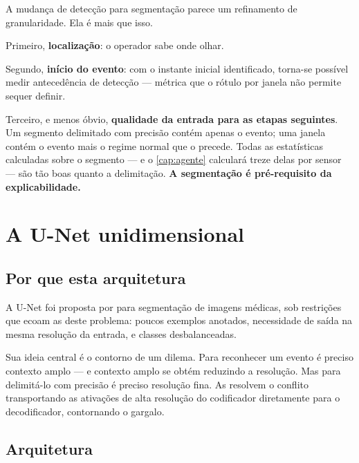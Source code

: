 \begin{destaque}
A mudança de detecção para segmentação parece um refinamento de granularidade. Ela é
mais que isso.

Primeiro, \textbf{localização}: o operador sabe onde olhar.

Segundo, \textbf{início do evento}: com o instante inicial identificado, torna-se
possível medir antecedência de detecção --- métrica que o rótulo por janela não permite
sequer definir.

Terceiro, e menos óbvio, \textbf{qualidade da entrada para as etapas seguintes}. Um
segmento delimitado com precisão contém apenas o evento; uma janela contém o evento mais
o regime normal que o precede. Todas as estat\'isticas calculadas sobre o segmento ---
e o \cref{cap:agente} calculará treze delas por sensor --- são tão boas quanto a
delimitação. \textbf{A segmentação é pré-requisito da explicabilidade.}
\end{destaque}

\section{A U-Net unidimensional}

\subsection{Por que esta arquitetura}

A U-Net foi proposta por \citet{Ronneberger2015} para segmentação de imagens médicas,
sob restrições que ecoam as deste problema: poucos exemplos anotados, necessidade de
saída na mesma resolução da entrada, e classes desbalanceadas.

Sua ideia central é o contorno de um dilema. Para reconhecer um evento é preciso
contexto amplo --- e contexto amplo se obtém reduzindo a resolução. Mas para delimitá-lo
com precisão é preciso resolução fina. As 
resolvem o conflito transportando as ativações de alta resolução do codificador
diretamente para o decodificador, contornando o gargalo.

\subsection{Arquitetura}

